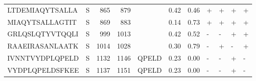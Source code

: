 \begin{tabular}{llrrlrrllll}
LTDEMIAQYTSALLA &       S &    865 &   879 &                     &            0.42 &             0.46 &      + &       + &      + &       + \\
MIAQYTSALLAGTIT &       S &    869 &   883 &                     &            0.14 &             0.73 &      + &       + &      + &       + \\
GRLQSLQTYVTQQLI &       S &    999 &  1013 &                     &            0.42 &             0.52 &      - &       - &      + &       + \\
RAAEIRASANLAATK &       S &   1014 &  1028 &                     &            0.30 &             0.79 &      - &       + &      - &       + \\
IVNNTVYDPLQPELD &       S &   1132 &  1146 &               QPELD &            0.23 &             0.00 &      - &       - &      + &       - \\
VYDPLQPELDSFKEE &       S &   1137 &  1151 &               QPELD &            0.23 &             0.00 &      - &       - &      + &       - \\
\bottomrule
\end{tabular}

